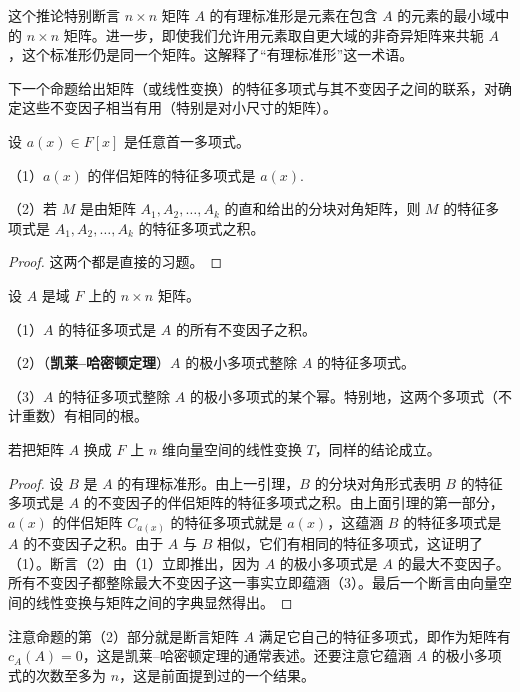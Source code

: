 这个推论特别断言 \(n \times n\) 矩阵 \(A\) 的有理标准形是元素在包含 \(A\) 的元素的最小域中的 \(n \times n\) 矩阵。进一步，即使我们允许用元素取自更大域的非奇异矩阵来共轭 \(A\)，这个标准形仍是同一个矩阵。这解释了“有理标准形”这一术语。

下一个命题给出矩阵（或线性变换）的特征多项式与其不变因子之间的联系，对确定这些不变因子相当有用（特别是对小尺寸的矩阵）。

\begin{lemma}\label{lem:12.19}
设 \(a(x) \in F[x]\) 是任意首一多项式。

（1）\(a(x)\) 的伴侣矩阵的特征多项式是 \(a(x)\).

（2）若 \(M\) 是由矩阵 \(A_1, A_2, \ldots, A_k\) 的直和给出的分块对角矩阵，则 \(M\) 的特征多项式是 \(A_1, A_2, \ldots, A_k\) 的特征多项式之积。
\end{lemma}

\begin{proof}
这两个都是直接的习题。
\end{proof}

\begin{proposition}\label{pro:12.20}
设 \(A\) 是域 \(F\) 上的 \(n \times n\) 矩阵。

（1）\(A\) 的特征多项式是 \(A\) 的所有不变因子之积。

（2）（\textbf{凯莱--哈密顿定理}）\(A\) 的极小多项式整除 \(A\) 的特征多项式。

（3）\(A\) 的特征多项式整除 \(A\) 的极小多项式的某个幂。特别地，这两个多项式（不计重数）有相同的根。

若把矩阵 \(A\) 换成 \(F\) 上 \(n\) 维向量空间的线性变换 \(T\)，同样的结论成立。
\end{proposition}

\begin{proof}
设 \(B\) 是 \(A\) 的有理标准形。由上一引理，\(B\) 的分块对角形式表明 \(B\) 的特征多项式是 \(A\) 的不变因子的伴侣矩阵的特征多项式之积。由上面引理的第一部分，\(a(x)\) 的伴侣矩阵 \(C_{a(x)}\) 的特征多项式就是 \(a(x)\)，这蕴涵 \(B\) 的特征多项式是 \(A\) 的不变因子之积。由于 \(A\) 与 \(B\) 相似，它们有相同的特征多项式，这证明了（1）。断言（2）由（1）立即推出，因为 \(A\) 的极小多项式是 \(A\) 的最大不变因子。所有不变因子都整除最大不变因子这一事实立即蕴涵（3）。最后一个断言由向量空间的线性变换与矩阵之间的字典显然得出。
\end{proof}

注意命题的第（2）部分就是断言矩阵 \(A\) 满足它自己的特征多项式，即作为矩阵有 \(c_A(A) = 0\)，这是凯莱--哈密顿定理的通常表述。还要注意它蕴涵 \(A\) 的极小多项式的次数至多为 \(n\)，这是前面提到过的一个结果。

